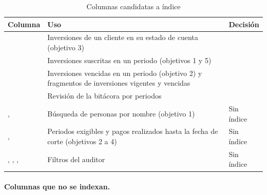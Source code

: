 \begin{table}[H]
	\centering
	\small
	\caption{Columnas candidatas a índice}
	\label{tab:indices-candidatas}
	\begin{tabular}{@{}L{4.6cm} L{6.4cm} L{4.8cm}@{}}
		\toprule
		\textbf{Columna} & \textbf{Uso} & \textbf{Decisión} \\
		\midrule
		 & Inversiones de un cliente en su estado de cuenta (objetivo 3) &  \\
		 & Inversiones suscritas en un periodo (objetivos 1 y 5) &  \\
		 & Inversiones vencidas en un periodo (objetivo 2) y fragmentos de inversiones vigentes y vencidas &  \\
		 & Revisión de la bitácora por periodos &  \\
		,  & Búsqueda de personas por nombre (objetivo 1) & Sin índice \\
		,  & Periodos exigibles y pagos realizados hasta la fecha de corte (objetivos 2 a 4) & Sin índice \\
		, , ,  & Filtros del auditor & Sin índice \\
		\bottomrule
	\end{tabular}
\end{table}

\paragraph{Columnas que no se indexan.}

